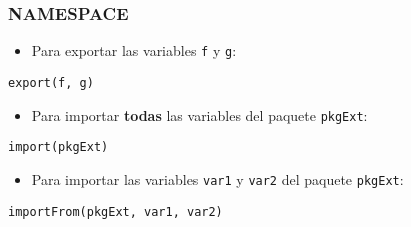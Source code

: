 \documentclass[xcolor={usenames,svgnames,dvipsnames}]{beamer}
\begin{document}
\begin{frame}[fragile]
\frametitle{NAMESPACE}
\label{sec-2-5}

\begin{itemize}
\item Para exportar las variables \texttt{f} y \texttt{g}:
\end{itemize}

\lstset{language=R}
\begin{lstlisting}
export(f, g)
\end{lstlisting}
\begin{itemize}
\item Para importar \textbf{todas} las variables del paquete \texttt{pkgExt}:
\end{itemize}

\lstset{language=R}
\begin{lstlisting}
import(pkgExt)
\end{lstlisting}
\begin{itemize}
\item Para importar las variables \texttt{var1} y \texttt{var2} del paquete
  \texttt{pkgExt}:
\end{itemize}

\lstset{language=R}
\begin{lstlisting}
importFrom(pkgExt, var1, var2)
\end{lstlisting}
\end{frame}
\end{document}
